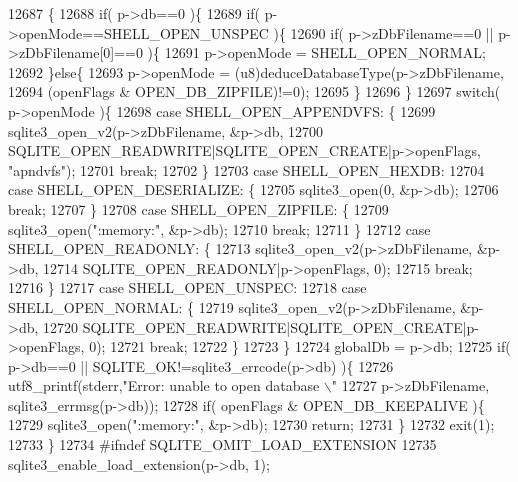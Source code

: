 \begin{DoxyCode}
12687                                                  \{
12688   \textcolor{keywordflow}{if}( p->db==0 )\{
12689     \textcolor{keywordflow}{if}( p->openMode==SHELL_OPEN_UNSPEC )\{
12690       \textcolor{keywordflow}{if}( p->zDbFilename==0 || p->zDbFilename[0]==0 )\{
12691         p->openMode = SHELL_OPEN_NORMAL;
12692       \}\textcolor{keywordflow}{else}\{
12693         p->openMode = (u8)deduceDatabaseType(p->zDbFilename, 
12694                              (openFlags & OPEN_DB_ZIPFILE)!=0);
12695       \}
12696     \}
12697     \textcolor{keywordflow}{switch}( p->openMode )\{
12698       \textcolor{keywordflow}{case} SHELL_OPEN_APPENDVFS: \{
12699         sqlite3_open_v2(p->zDbFilename, &p->db, 
12700            SQLITE_OPEN_READWRITE|SQLITE_OPEN_CREATE|p->openFlags, \textcolor{stringliteral}{"apndvfs"});
12701         \textcolor{keywordflow}{break};
12702       \}
12703       \textcolor{keywordflow}{case} SHELL_OPEN_HEXDB:
12704       \textcolor{keywordflow}{case} SHELL_OPEN_DESERIALIZE: \{
12705         sqlite3_open(0, &p->db);
12706         \textcolor{keywordflow}{break};
12707       \}
12708       \textcolor{keywordflow}{case} SHELL_OPEN_ZIPFILE: \{
12709         sqlite3_open(\textcolor{stringliteral}{":memory:"}, &p->db);
12710         \textcolor{keywordflow}{break};
12711       \}
12712       \textcolor{keywordflow}{case} SHELL_OPEN_READONLY: \{
12713         sqlite3_open_v2(p->zDbFilename, &p->db,
12714             SQLITE_OPEN_READONLY|p->openFlags, 0);
12715         \textcolor{keywordflow}{break};
12716       \}
12717       \textcolor{keywordflow}{case} SHELL_OPEN_UNSPEC:
12718       \textcolor{keywordflow}{case} SHELL_OPEN_NORMAL: \{
12719         sqlite3_open_v2(p->zDbFilename, &p->db,
12720            SQLITE_OPEN_READWRITE|SQLITE_OPEN_CREATE|p->openFlags, 0);
12721         \textcolor{keywordflow}{break};
12722       \}
12723     \}
12724     globalDb = p->db;
12725     \textcolor{keywordflow}{if}( p->db==0 || SQLITE_OK!=sqlite3_errcode(p->db) )\{
12726       utf8_printf(stderr,\textcolor{stringliteral}{"Error: unable to open database \(\backslash\)"%
12727           p->zDbFilename, sqlite3_errmsg(p->db));
12728       \textcolor{keywordflow}{if}( openFlags & OPEN_DB_KEEPALIVE )\{
12729         sqlite3_open(\textcolor{stringliteral}{":memory:"}, &p->db);
12730         \textcolor{keywordflow}{return};
12731       \}
12732       exit(1);
12733     \}
12734 \textcolor{preprocessor}{#ifndef SQLITE\_OMIT\_LOAD\_EXTENSION}
12735     sqlite3_enable_load_extension(p->db, 1);
}
\end{DoxyCode}
